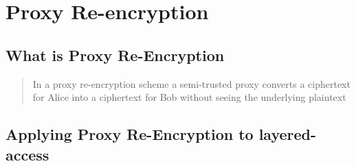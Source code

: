 \section{Proxy Re-encryption}

\subsection{What is Proxy Re-Encryption}

\begin{quotation}
  In a proxy re-encryption scheme a semi-trusted proxy converts a ciphertext for Alice into a ciphertext for Bob without seeing the underlying plaintext \autocite{greenateniese:2006:article}
\end{quotation}

\subsection{Applying Proxy Re-Encryption to layered-access}
